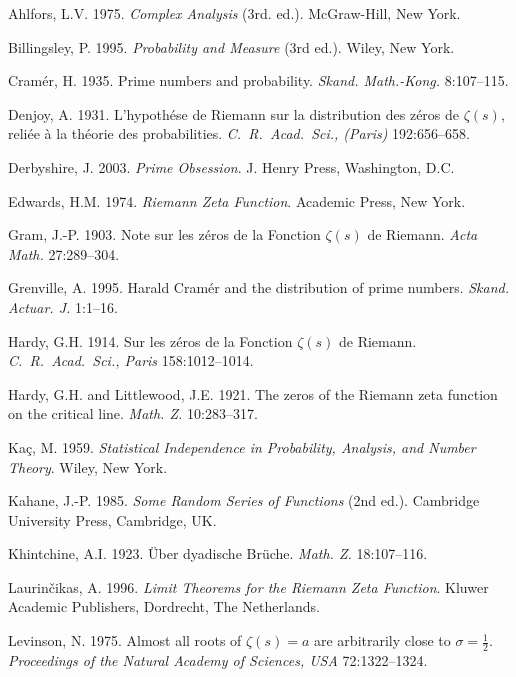 \documentclass[11pt]{article}
\begin{document}
\begin{thebibliography}{99}
 Ahlfors, L.V. 1975. \emph{Complex Analysis} (3rd. ed.). McGraw-Hill, New York.

 Billingsley, P. 1995. \emph{Probability and Measure} (3rd ed.). Wiley, New York.

 Cramér, H. 1935. Prime numbers and probability. \emph{Skand. Math.-Kong.} 8:107--115.

 Denjoy, A. 1931. L'hypothése de Riemann sur la distribution des zéros de $\zeta(s)$, reliée à la théorie des probabilities. \emph{C.~R.~Acad.~Sci., (Paris)} 192:656--658.

 Derbyshire, J. 2003. \emph{Prime Obsession}. J. Henry Press, Washington, D.C.

 Edwards, H.M. 1974. \emph{Riemann Zeta Function}. Academic Press, New York.

 Gram, J.-P. 1903. Note sur les zéros de la Fonction $\zeta(s)$ de Riemann. \emph{Acta Math.} 27:289--304.

 Grenville, A. 1995. Harald Cramér and the distribution of prime numbers. \emph{Skand. Actuar. J.} 1:1--16.

 Hardy, G.H. 1914. Sur les zéros de la Fonction $\zeta(s)$ de Riemann. \emph{C.~R.~Acad.~Sci., Paris} 158:1012--1014.

 Hardy, G.H. and Littlewood, J.E. 1921. The zeros of the Riemann zeta function on the critical line. \emph{Math. Z.} 10:283--317.

 Kaç, M. 1959. \emph{Statistical Independence in Probability, Analysis, and Number Theory}. Wiley, New York.

 Kahane, J.-P. 1985. \emph{Some Random Series of Functions} (2nd ed.). Cambridge University Press, Cambridge, UK.

 Khintchine, A.I. 1923. Über dyadische Brüche. \emph{Math. Z.} 18:107--116.

 Laurin\v{c}ikas, A. 1996. \emph{Limit Theorems for the Riemann Zeta Function}. Kluwer Academic Publishers, Dordrecht, The Netherlands.

 Levinson, N. 1975. Almost all roots of $\zeta(s) = a$ are arbitrarily close to $\sigma = \frac{1}{2}$. \emph{Proceedings of the Natural Academy of Sciences, USA} 72:1322--1324.


\end{thebibliography}
\end{document}
